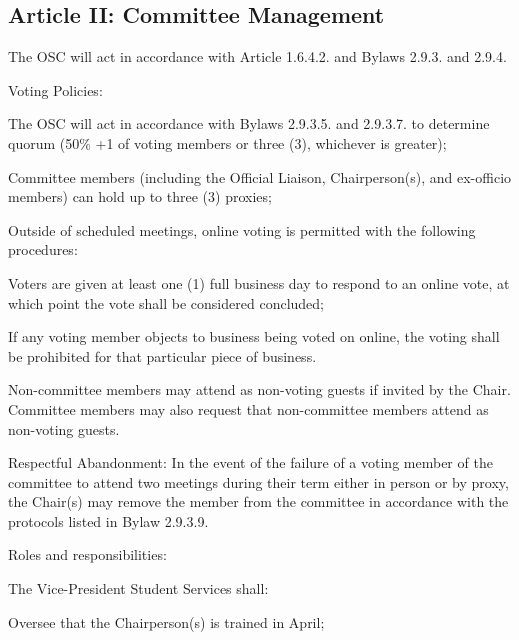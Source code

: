 \subsection{Article II: Committee Management}
\begin{longenum}[ label*=\thesubsection.\arabic*., align=left] 
	\item The OSC will act in accordance with Article 1.6.4.2. and Bylaws 2.9.3. and 2.9.4.
	\item Voting Policies:	
		\begin{longenum}[label*=\arabic*., align=left]
		\item The OSC will act in accordance with Bylaws 2.9.3.5. and 2.9.3.7. to determine quorum (50\% +1 of voting members or three (3), whichever is greater); 
		\item Committee members (including the Official Liaison, Chairperson(s), and ex-officio members) can hold up to three (3) proxies;
		\item Outside of scheduled meetings, online voting is permitted with the following procedures:	
			\begin{longenum}[label*=\arabic*., align=left]			
			\item Voters are given at least one (1) full business day to respond to an online vote, at which point the vote shall be considered concluded;
			\item If any voting member objects to business being voted on online, the voting shall be prohibited for that particular piece of business.
			\end{longenum}
		\end{longenum}
	\item Non-committee members may attend as non-voting guests if invited by the Chair. Committee members may also request that non-committee members attend as non-voting guests.
	\item Respectful Abandonment: In the event of the failure of a voting member of the committee to attend two meetings during their term either in person or by proxy, the Chair(s) may remove the member from the committee in accordance with the protocols listed in Bylaw 2.9.3.9.
	\item Roles and responsibilities:
		\begin{longenum}[label*=\arabic*., align=left]
		\item The Vice-President Student Services shall:
			\begin{longenum}[label*=\arabic*., align=left]
			\item Oversee that the Chairperson(s) is trained in April;

\end{longenum}
\end{longenum}
\end{longenum}
